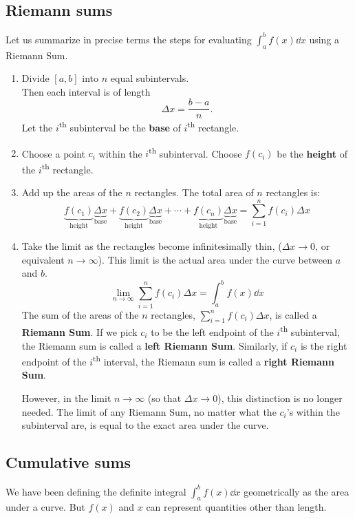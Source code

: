 \subsection{Riemann sums}
Let us summarize in precise terms the steps for evaluating $\int_a^bf(x)\dd x$ using a Riemann Sum.
\begin{enumerate}
\item Divide $[a,b]$ into $n$ equal subintervals.
  \\
  Then each interval is of length
  \[\Delta x=\frac{b-a}n.\]
  Let the $i$\textsuperscript{th} subinterval be the \textbf{base} of $i$\textsuperscript{th} rectangle.
\item Choose a point $c_i$ within the $i$\textsuperscript{th} subinterval. Choose $f(c_i)$ be the \textbf{height} of the $i$\textsuperscript{th} rectangle.
\item Add up the areas of the $n$ rectangles. The total area of $n$ rectangles is:
  \[\underbrace{f(c_1)}_{\text{height}}\underbrace{\Delta x}_{\text{base}}
  +\underbrace{f(c_2)}_{\text{height}}\underbrace{\Delta x}_{\text{base}}
  +\cdots
  +\underbrace{f(c_n)}_{\text{height}}\underbrace{\Delta x}_{\text{base}}
  =\sum_{i=1}^nf(c_i)\Delta x
  \]
\item Take the limit as the rectangles become infinitesimally thin, ($\Delta x\to0$, or equivalent $n\to\infty$). This limit is the actual area under the curve between $a$ and $b$.
  \[\lim_{n\to\infty}\sum_{i=1}^nf(c_i)\Delta x=\int_a^bf(x)\dd x\]
  The sum of the areas of the $n$ rectangles, $\sum_{i=1}^nf(c_i)\Delta x$, is called a \textbf{Riemann Sum}. If we pick $c_i$ to be the left endpoint of the $i$\textsuperscript{th} subinterval, the Riemann sum is called a \textbf{left Riemann Sum}. Similarly, if $c_i$ is the right endpoint of the $i$\textsuperscript{th} interval, the Riemann sum is called a \textbf{right Riemann Sum}.

  However, in the limit $n\to\infty$ (so that $\Delta x\to0$), this distinction is no longer needed. The limit of any Riemann Sum, no matter what the $c_i$'s within the subinterval are, is equal to the exact area under the curve.
\end{enumerate}
\subsection{Cumulative sums}
We have been defining the definite integral $\int_a^bf(x)\dd x$ geometrically as the area under a curve. But $f(x)$ and $x$ can represent quantities other than length.

